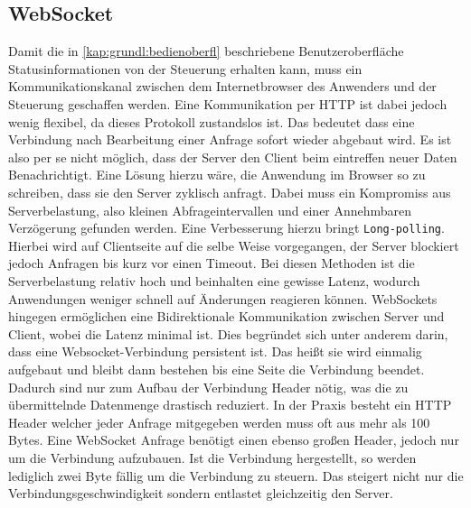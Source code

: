 \subsection{WebSocket} \label{chp:grdlgn:webSocket}
Damit die in \ref{kap:grundl:bedienoberfl} beschriebene Benutzeroberfläche Statusinformationen von der Steuerung erhalten kann, muss ein Kommunikationskanal zwischen dem Internetbrowser des Anwenders und der Steuerung geschaffen werden. Eine Kommunikation per HTTP ist dabei jedoch wenig flexibel, da dieses Protokoll zustandslos ist. Das bedeutet dass eine Verbindung nach Bearbeitung einer Anfrage sofort wieder abgebaut wird. Es ist also per se nicht möglich, dass der Server den Client beim eintreffen neuer Daten Benachrichtigt. Eine Lösung hierzu wäre, die Anwendung im Browser so zu schreiben, dass sie den Server zyklisch anfragt. Dabei muss ein Kompromiss aus Serverbelastung, also kleinen Abfrageintervallen und einer Annehmbaren Verzögerung gefunden werden. Eine Verbesserung hierzu bringt \texttt{Long-polling}. Hierbei wird auf Clientseite auf die selbe Weise vorgegangen, der Server blockiert jedoch Anfragen bis kurz vor einen Timeout. Bei diesen Methoden ist die Serverbelastung relativ hoch und beinhalten eine gewisse Latenz, wodurch Anwendungen weniger schnell auf Änderungen reagieren können. WebSockets hingegen ermöglichen eine Bidirektionale Kommunikation zwischen Server und Client, wobei die Latenz minimal ist. Dies begründet sich unter anderem darin, dass eine Websocket-Verbindung persistent ist. Das heißt sie wird einmalig aufgebaut und bleibt dann bestehen bis eine Seite die Verbindung beendet. Dadurch sind nur zum Aufbau der Verbindung Header nötig, was die zu übermittelnde Datenmenge drastisch reduziert. In der Praxis besteht ein HTTP Header welcher jeder Anfrage mitgegeben werden muss oft aus mehr als 100 Bytes. Eine WebSocket Anfrage benötigt einen ebenso großen Header, jedoch nur um die Verbindung aufzubauen. Ist die Verbindung hergestellt, so werden lediglich zwei Byte fällig um die Verbindung zu steuern. Das steigert nicht nur die Verbindungsgeschwindigkeit sondern entlastet gleichzeitig den Server.


